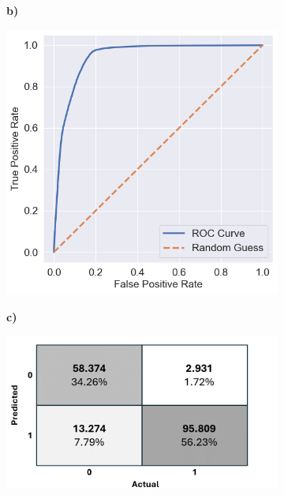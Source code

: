 \begin{figure}[!htbp]
\begin{center}
\begin{minipage}[b]{0.5\textwidth}
        \centering
        \begin{subfigure}[t]{0.06\textwidth}
            \textbf{b)}
        \end{subfigure}
        \begin{subfigure}[t]{0.9\textwidth}
            \includegraphics[width=\linewidth, valign=t]{images/Model_Training/Initial_ROC_curve_square.png}
        \end{subfigure}
    \end{minipage}%
    \hfill\allowbreak%
    \begin{minipage}[b]{0.75\textwidth}
        \centering
        \begin{subfigure}[t]{0.06\textwidth}
            \textbf{c)}
        \end{subfigure}
        \begin{subfigure}[t]{0.9\textwidth}
            \includegraphics[width=\linewidth, valign=t]{images/Model_Training/Initial_Confusion_Matrix_PP.png}
        \end{subfigure}
    \end{minipage}
    \end{center}


\end{figure}
